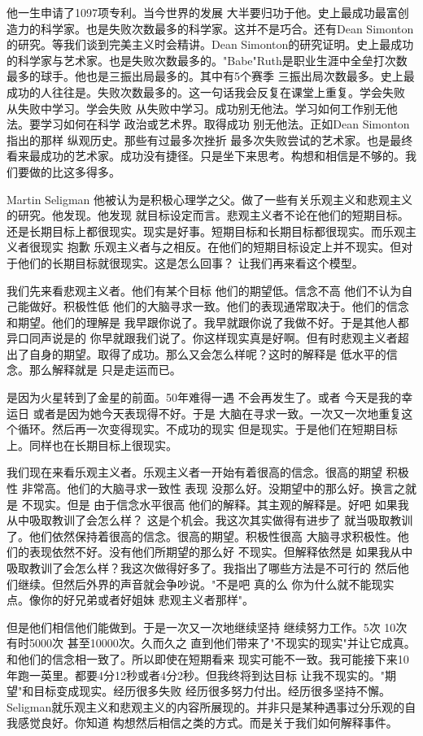 他一生申请了1097项专利。当今世界的发展 大半要归功于他。史上最成功最富创造力的科学家。也是失败次数最多的科学家。这并不是巧合。还有Dean Simonton的研究。等我们谈到完美主义时会精讲。Dean Simonton的研究证明。史上最成功的科学家与艺术家。也是失败次数最多的。"Babe"Ruth是职业生涯中全垒打次数最多的球手。他也是三振出局最多的。其中有5个赛季 三振出局次数最多。史上最成功的人往往是。失败次数最多的。这一句话我会反复在课堂上重复。学会失败 从失败中学习。学会失败 从失败中学习。成功别无他法。学习如何工作别无他法。要学习如何在科学 政治或艺术界。取得成功 别无他法。正如Dean Simonton指出的那样 纵观历史。那些有过最多次挫折 最多次失败尝试的艺术家。也是最终看来最成功的艺术家。成功没有捷径。只是坐下来思考。构想和相信是不够的。我们要做的比这多得多。 

Martin Seligman 他被认为是积极心理学之父。做了一些有关乐观主义和悲观主义的研究。他发现。他发现 就目标设定而言。悲观主义者不论在他们的短期目标。还是长期目标上都很现实。现实是好事。短期目标和长期目标都很现实。而乐观主义者很现实 抱歉 乐观主义者与之相反。在他们的短期目标设定上并不现实。但对于他们的长期目标就很现实。这是怎么回事？ 让我们再来看这个模型。 

我们先来看悲观主义者。他们有某个目标 他们的期望低。信念不高 他们不认为自己能做好。积极性低 他们的大脑寻求一致。他们的表现通常取决于。他们的信念和期望。他们的理解是 我早跟你说了。我早就跟你说了我做不好。于是其他人都异口同声说是的 你早就跟我们说了。你这样现实真是好啊。但有时悲观主义者超出了自身的期望。取得了成功。那么又会怎么样呢？这时的解释是 低水平的信念。那么解释就是 只是走运而已。 

是因为火星转到了金星的前面。50年难得一遇 不会再发生了。或者 今天是我的幸运日 或者是因为她今天表现得不好。于是 大脑在寻求一致。一次又一次地重复这个循环。然后再一次变得现实。不成功的现实 但是现实。于是他们在短期目标上。同样也在长期目标上很现实。 

我们现在来看乐观主义者。乐观主义者一开始有着很高的信念。很高的期望 积极性 非常高。他们的大脑寻求一致性 表现 没那么好。没期望中的那么好。换言之就是 不现实。但是 由于信念水平很高 他们的解释。其主观的解释是。好吧 如果我从中吸取教训了会怎么样？ 这是个机会。我这次其实做得有进步了 就当吸取教训了。他们依然保持着很高的信念。很高的期望。积极性很高 大脑寻求积极性。他们的表现依然不好。没有他们所期望的那么好 不现实。但解释依然是 如果我从中吸取教训了会怎么样？我这次做得好多了。我指出了哪些方法是不可行的 然后他们继续。但然后外界的声音就会争吵说。"不是吧 真的么 你为什么就不能现实点。像你的好兄弟或者好姐妹 悲观主义者那样"。 

但是他们相信他们能做到。于是一次又一次地继续坚持 继续努力工作。5次 10次 有时5000次 甚至10000次。久而久之 直到他们带来了"不现实的现实"并让它成真。和他们的信念相一致了。所以即使在短期看来 现实可能不一致。我可能接下来10年跑一英里。都要4分12秒或者4分2秒。但我终将到达目标 让我不现实的。"期望"和目标变成现实。经历很多失败 经历很多努力付出。经历很多坚持不懈。Seligman就乐观主义和悲观主义的内容所展现的。并非只是某种遇事过分乐观的自我感觉良好。你知道 构想然后相信之类的方式。而是关于我们如何解释事件。 

